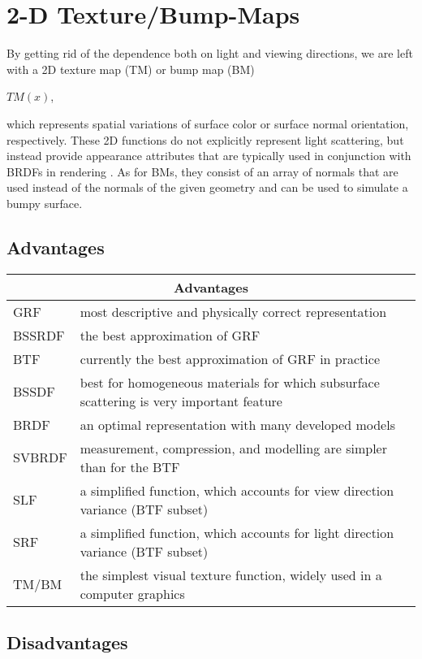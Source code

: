 \section{2-D Texture/Bump-Maps}
\label{section:2dtexture}
By getting rid of the dependence both on light and viewing directions, we are left with a 2D texture map (TM) or bump map (BM)
 \begin{center}
$TM(x)$,
 \end{center}
 which represents spatial variations of surface color or surface
normal orientation, respectively\cite{dong}. 
These 2D functions do not explicitly represent light scattering, but instead provide appearance attributes that are typically used in conjunction with BRDFs in rendering \cite{dong}. 
As for BMs, they consist of an array of normals that are used instead of the normals of the given geometry and can be used to simulate a bumpy surface.




\subsection{Advantages}
\label{section:Advantages}


\begin{tabular}{ |l|l| }
  \hline
  \multicolumn{2}{|c|}{Advantages} \\
  \hline
  GRF &  most descriptive and physically correct representation  \\
  BSSRDF & the best approximation of GRF \\
  BTF & currently the best approximation of GRF in practice \\
  BSSDF & best for homogeneous materials for which subsurface scattering is very important feature \\
  BRDF &  an optimal representation with many developed models \\
  SVBRDF & measurement, compression, and modelling are simpler than for the BTF \\
  SLF & a simplified function, which accounts for view direction variance (BTF subset) \\
  SRF & a simplified function, which accounts for light direction variance (BTF subset) \\
  TM/BM & the simplest visual texture function, widely used in a computer graphics\\
  \hline
\end{tabular}


\subsection{Disadvantages}
\label{section:Disadvantages}


